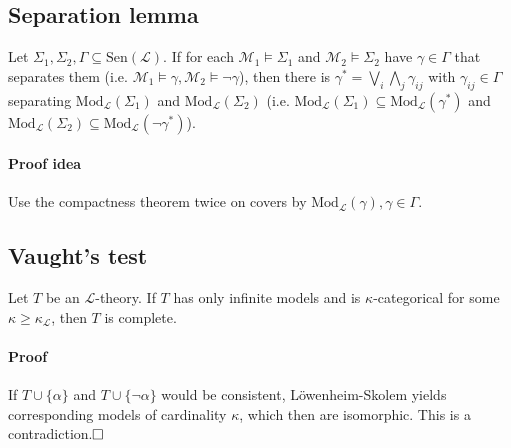 \documentclass{scrartcl}
\begin{document}
\subsection{Separation lemma}
\label{separation_lemma}
Let $\Sigma_1, \Sigma_2, \Gamma \subseteq \mathrm{Sen}(\mathcal{L})$. If for each $\mathcal{M}_1 \models \Sigma_1$ and $\mathcal{M}_2 \models \Sigma_2$ have $\gamma \in \Gamma$ that separates them (i.e. $\mathcal{M}_1 \models \gamma, \mathcal{M}_2 \models \neg\gamma$), then there is $\gamma^* = \bigvee_i \bigwedge_j \gamma_{ij}$ with $\gamma_{ij} \in \Gamma$ separating $\mathrm{Mod}_{\mathcal{L}}(\Sigma_1)$ and $\mathrm{Mod}_{\mathcal{L}}(\Sigma_2)$ (i.e. $\mathrm{Mod}_{\mathcal{L}}(\Sigma_1) \subseteq \mathrm{Mod}_{\mathcal{L}}(\gamma^*)$ and $\mathrm{Mod}_{\mathcal{L}}(\Sigma_2) \subseteq \mathrm{Mod}_{\mathcal{L}}(\neg\gamma^*)$).
\paragraph{Proof idea} Use the compactness theorem twice on covers by $\mathrm{Mod}_{\mathcal{L}}(\gamma), \gamma \in \Gamma$.

\subsection{Vaught's test}
Let $T$ be an $\mathcal{L}$-theory. If $T$ has only infinite models and is $\kappa$-categorical for some $\kappa \geq \kappa_{\mathcal{L}}$, then $T$ is complete.
\paragraph{Proof} If $T \cup \{\alpha\}$ and $T \cup \{\neg \alpha\}$ would be consistent, Löwenheim-Skolem yields corresponding models of cardinality $\kappa$, which then are isomorphic. This is a contradiction.$\hfill\square$
\end{document}
